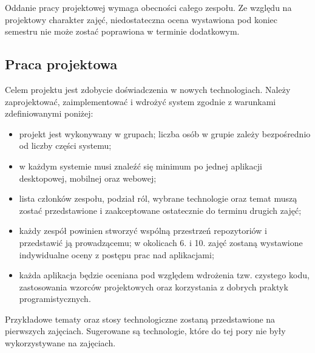 \documentclass{article}
\begin{document}
	Oddanie pracy projektowej wymaga obecności całego zespołu. Ze względu na projektowy charakter zajęć, niedostateczna ocena wystawiona pod koniec semestru nie może zostać poprawiona w terminie dodatkowym.
	
	\subsection{Praca projektowa}
	Celem projektu jest zdobycie doświadczenia w nowych technologiach. Należy zaprojektować, zaimplementować i wdrożyć system zgodnie z warunkami zdefiniowanymi poniżej:
	
	\begin{itemize}
		\item projekt jest wykonywany w grupach; liczba osób w grupie zależy bezpośrednio od liczby części systemu;
		\item w każdym systemie musi znaleźć się minimum po jednej aplikacji desktopowej, mobilnej oraz webowej;
		\item lista członków zespołu, podział ról, wybrane technologie oraz temat muszą zostać przedstawione i zaakceptowane ostatecznie do terminu drugich zajęć;
		\item każdy zespół powinien stworzyć wspólną przestrzeń repozytoriów i przedstawić ją prowadzącemu; w okolicach 6. i 10. zajęć zostaną wystawione indywidualne oceny z postępu prac nad aplikacjami;
		\item każda aplikacja będzie oceniana pod względem wdrożenia tzw. czystego kodu, zastosowania wzorców projektowych oraz korzystania z dobrych praktyk programistycznych.
	\end{itemize}
	
	Przykładowe tematy oraz stosy technologiczne zostaną przedstawione na pierwszych zajęciach. Sugerowane są technologie, które do tej pory nie były wykorzystywane na zajęciach.
	
\end{document}
